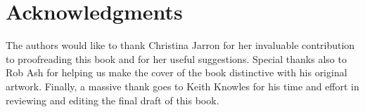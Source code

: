%
%
%
\chapter*{Acknowledgments}
The authors would like to thank Christina Jarron for her invaluable contribution to proofreading this book and for her useful suggestions. Special thanks also to Rob Ash for helping us make the cover of the book distinctive with his original artwork. Finally, a massive thank goes to Keith Knowles for his time and effort in reviewing and editing the final draft of this book.

